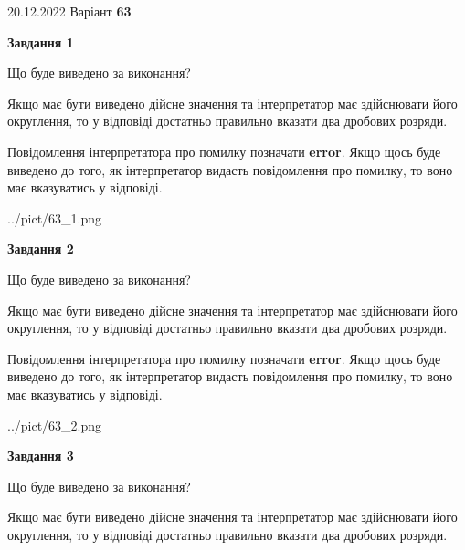 \documentclass[12pt, ukrainian]{article}
\begin{document}
{20.12.2022 Варіант \No \textbf { 63 }\par}
{
\begin {Large}

{\begin {center}\textbf{Завдання 1}\end {center}}\par
Що буде виведено за виконання? \par

Якщо має бути виведено дійсне значення та інтерпретатор має здійснювати його округлення, 
то у відповіді достатньо правильно вказати два дробових розряди.

Повідомлення інтерпретатора про помилку позначати \textbf{error}.
Якщо щось буде виведено до того, як інтерпретатор видасть повідомлення про помилку, 
то воно має вказуватись у відповіді. \par

\begin{center}
	{../pict/63_1.png}
\end{center}
\newpage

{\begin {center}\textbf{Завдання 2}\end {center}}\par
Що буде виведено за виконання? \par

Якщо має бути виведено дійсне значення та інтерпретатор має здійснювати його округлення, 
то у відповіді достатньо правильно вказати два дробових розряди.

Повідомлення інтерпретатора про помилку позначати \textbf{error}.
Якщо щось буде виведено до того, як інтерпретатор видасть повідомлення про помилку, 
то воно має вказуватись у відповіді. \par

\begin{center}
	{../pict/63_2.png}
\end{center}
\newpage

{\begin {center}\textbf{Завдання 3}\end {center}}\par
Що буде виведено за виконання? \par

Якщо має бути виведено дійсне значення та інтерпретатор має здійснювати його округлення, 
то у відповіді достатньо правильно вказати два дробових розряди.


\end{Large}}
\end{document}
